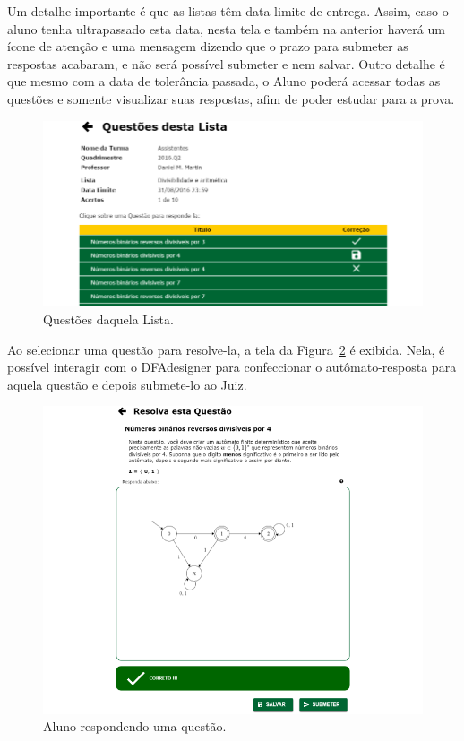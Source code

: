 \documentclass[
	12pt,				%
	openany,
	oneside,
	a4paper,			%
	english,			%
	brazil				%
	]{abntex2}
\begin{document}
  Um detalhe importante é que as listas têm data limite de entrega. Assim, caso o aluno tenha ultrapassado esta data, nesta tela e também na anterior haverá um ícone de atenção e uma mensagem dizendo que o prazo para submeter as respostas acabaram, e não será possível submeter e nem salvar. Outro detalhe é que mesmo com a data de tolerância passada, o Aluno poderá acessar todas as questões e somente visualizar suas respostas, afim de poder estudar para a prova.

\begin{figure}[H]
  \centering
  \includegraphics[width=\textwidth]{prints/alunoQuestoes.png}
  \caption{Questões daquela Lista.}
  \label{print:alunoQuestoes}
  \vspace{-0.5cm}
\end{figure}

  Ao selecionar uma questão para resolve-la, a tela da Figura~\ref{print:alunoResposta} é exibida. Nela, é possível interagir com o DFAdesigner para confeccionar o autômato-resposta para aquela questão e depois submete-lo ao Juiz.%

\begin{figure}[H]
  \centering
  \includegraphics[width=\textwidth]{prints/alunoResposta.png}
  \caption{Aluno respondendo uma questão.}
  \label{print:alunoResposta}
  \vspace{-0.5cm}
\end{figure}
\end{document}
